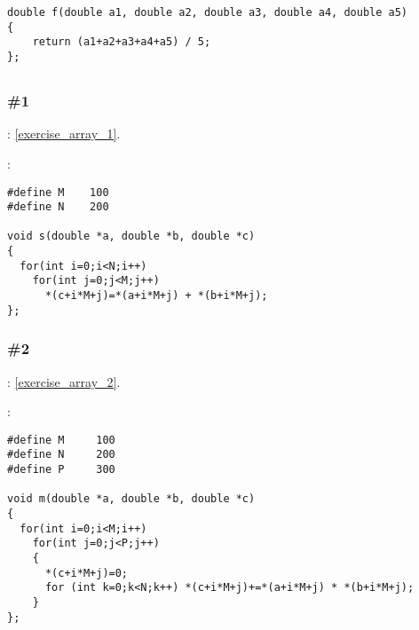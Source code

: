 \begin{lstlisting}
double f(double a1, double a2, double a3, double a4, double a5)
{
	return (a1+a2+a3+a4+a5) / 5;
};
\end{lstlisting}

\subsection{}

\subsubsection{\Exercise \#1}
\label{exercise_solutions_arrays_1}

\Exercise: \ref{exercise_array_1}.


:

\begin{lstlisting}
#define M    100
#define N    200

void s(double *a, double *b, double *c)
{
  for(int i=0;i<N;i++)
    for(int j=0;j<M;j++)
      *(c+i*M+j)=*(a+i*M+j) + *(b+i*M+j);
};
\end{lstlisting}

\subsubsection{\Exercise \#2}
\label{exercise_solutions_arrays_2}

\Exercise: \ref{exercise_array_2}.


:

\begin{lstlisting}
#define M     100
#define N     200
#define P     300

void m(double *a, double *b, double *c)
{
  for(int i=0;i<M;i++)
    for(int j=0;j<P;j++)
    {
      *(c+i*M+j)=0;
      for (int k=0;k<N;k++) *(c+i*M+j)+=*(a+i*M+j) * *(b+i*M+j);
    }
};
\end{lstlisting}

